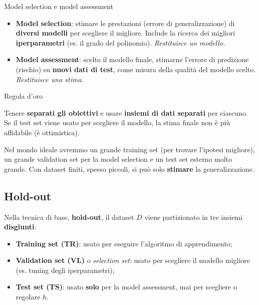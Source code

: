 \begin{boxdefinition}{Model selection e model assessment}

\begin{itemize}
\tightlist
\item
  \textbf{Model selection}: stimare le prestazioni (errore di
  generalizzazione) di \textbf{diversi modelli} per scegliere il
  migliore. Include la ricerca dei migliori \textbf{iperparametri} (es.
  il grado del polinomio). \emph{Restituisce un modello.}
\item
  \textbf{Model assessment}: scelto il modello finale, stimarne l'errore
  di predizione (rischio) su \textbf{nuovi dati di test}, come misura
  della qualità del modello scelto. \emph{Restituisce una stima.}
\end{itemize}

\end{boxdefinition}

\begin{boxwarning}{Regola d'oro}

Tenere \textbf{separati gli obiettivi} e usare \textbf{insiemi di dati
separati} per ciascuno. Se il test set viene usato per scegliere il
modello, la stima finale non è più affidabile (è ottimistica).

\end{boxwarning}

Nel mondo ideale avremmo un grande training set (per trovare l'ipotesi
migliore), un grande validation set per la model selection e un test set
esterno molto grande. Con dataset finiti, spesso piccoli, si può solo
\textbf{stimare} la generalizzazione.

\subsection{Hold-out}\label{hold-out}

Nella tecnica di base, \textbf{hold-out}, il dataset \(D\) viene
partizionato in tre insiemi \textbf{disgiunti}:

\begin{itemize}
\tightlist
\item
  \textbf{Training set (TR)}: usato per eseguire l'algoritmo di
  apprendimento;
\item
  \textbf{Validation set (VL)} o \emph{selection set}: usato per
  scegliere il modello migliore (es. tuning degli iperparametri);
\item
  \textbf{Test set (TS)}: usato \textbf{solo} per la model assessment,
  mai per scegliere o regolare \(h\).
\end{itemize}

